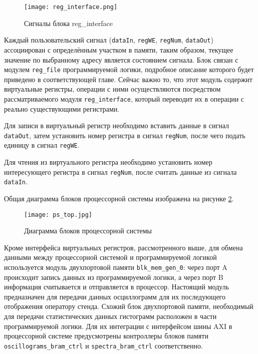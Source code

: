 \begin{figure}[ht]
    \centering
    \texttt{[image: reg\_interface.png]}
    \caption{Сигналы блока reg\_interface}
    \label{fig:reg_interface}
\end{figure}
Каждый пользовательский сигнал (\texttt{dataIn}, \texttt{regWE}, \texttt{regNum}, \texttt{dataOut}) ассоциирован с определённым участком в памяти, таким образом, текущее значение по выбранному адресу является состоянием сигнала. Блок связан с модулем \texttt{reg\_file} программируемой логики, подробное описание которого будет приведено в соответствующей главе. Сейчас важно то, что этот модуль содержит виртуальные регистры, операции с ними осуществляются посредством рассматриваемого модуля \texttt{reg\_interface}, который переводит их в операции с реально существующими регистрами.\par
Для записи в виртуальный регистр необходимо вставить данные в сигнал \texttt{dataOut}, затем установить номер регистра в сигнал \texttt{regNum}, после чего подать единицу в сигнал \texttt{regWE}.\par
Для чтения из виртуального регистра необходимо установить номер интересующего регистра в сигнал \texttt{regNum}, после считать данные из сигнала \texttt{dataIn}.\par
Общая диаграмма блоков процессорной системы изображена на рисунке \ref{fig:ps_top}.\par
\begin{figure}[ht]
    \centering
    \texttt{[image: ps\_top.jpg]}
    \caption{Диаграмма блоков процессорной системы}
    \label{fig:ps_top}
\end{figure}
Кроме интерфейса виртуальных регистров, рассмотренного выше, для обмена данными между процессорной системой и программируемой логикой используется модуль двухпортовой памяти \texttt{blk\_mem\_gen\_0}: через порт A происходит запись данных из программируемой логики, а через порт B информация считывается и отправляется в процессор. Настоящий модуль предназначен для передачи данных осциллограмм для их последующего отображения оператору стенда. Схожий блок двухпортовой памяти, необходимый для передачи статистических данных гистограмм расположен в части программируемой логики. Для их интеграции с интерфейсом шины AXI в процессорной системе предусмотрены контроллеры блоков памяти \texttt{oscillograms\_bram\_ctrl} и \texttt{spectra\_bram\_ctrl} соответственно.\par

